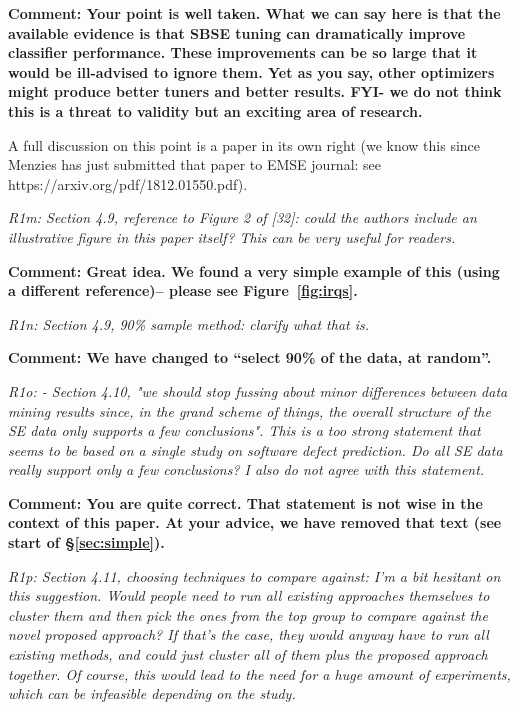 \documentclass[preprint,10pt]{elsarticle}
\begin{document}
{\bf Comment: Your point is well taken. What we can say here is that the available evidence is that SBSE
tuning can dramatically improve classifier performance. These improvements can be so large that it
would be ill-advised to ignore them. Yet as you say, other optimizers might produce better tuners and better results. FYI- we do not think this is a threat to validity but an exciting area of research. 

A full discussion on this point is a paper in its own right
(we know this since Menzies has just submitted that paper to EMSE journal: \newline see https://arxiv.org/pdf/1812.01550.pdf).  
}


{\em R1m: Section 4.9, reference to Figure 2 of [32]: could the authors include an illustrative figure in this paper itself? This can be very useful for readers.}

{\bf Comment: Great idea. We found  a very simple example of this (using a different reference)--  please see Figure~\ref{fig:irqs}.}


{\em R1n:  Section 4.9, 90\% sample method: clarify what that is.}

{\bf Comment:   We have changed to
``select
 90\% of the data, at random''.}


{\em R1o: - Section 4.10, "we should stop fussing about minor differences between data mining results since, in the grand scheme of things, the overall structure of the SE data only supports a few conclusions". This is a too strong statement that seems to be based on a single study on software defect prediction. Do all SE data really support only a few conclusions? I also do not agree with this statement.}

{\bf Comment:   You are quite correct. That statement is not wise in the context
of this paper. At your advice, we have removed that text (see start of \S\vref{sec:simple}).
}

{\em R1p:  Section 4.11, choosing techniques to compare against: I'm a bit hesitant on this suggestion. Would people need to run all existing approaches themselves to cluster them and then pick the ones from the top group to compare against the novel proposed approach? If that's the case, they would anyway have to run all existing methods, and could just cluster all of them plus the proposed approach together. Of course, this would lead to the need for a huge amount of experiments, which can be infeasible depending on the study.}
\end{document}
